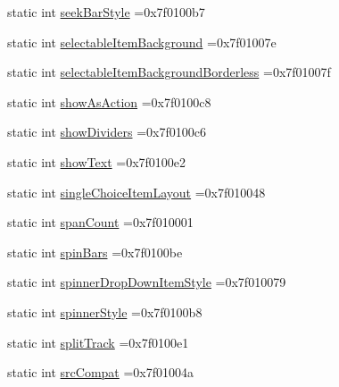 \begin{DoxyCompactItemize}
\item 
static int \hyperlink{classandroid_1_1support_1_1graphics_1_1drawable_1_1R_1_1attr_a460851de45b3a676c01374535644ce2b}{seek\+Bar\+Style} =0x7f0100b7
\item 
static int \hyperlink{classandroid_1_1support_1_1graphics_1_1drawable_1_1R_1_1attr_a04a5ca77af49b575c68c894e524bf504}{selectable\+Item\+Background} =0x7f01007e
\item 
static int \hyperlink{classandroid_1_1support_1_1graphics_1_1drawable_1_1R_1_1attr_a9eb0f075fffc9ddf38011fb7dca661bc}{selectable\+Item\+Background\+Borderless} =0x7f01007f
\item 
static int \hyperlink{classandroid_1_1support_1_1graphics_1_1drawable_1_1R_1_1attr_adbc2e16f8d86de865cf504334096fcf7}{show\+As\+Action} =0x7f0100c8
\item 
static int \hyperlink{classandroid_1_1support_1_1graphics_1_1drawable_1_1R_1_1attr_a319d898a91de1f1ef8f7ff796da4245f}{show\+Dividers} =0x7f0100c6
\item 
static int \hyperlink{classandroid_1_1support_1_1graphics_1_1drawable_1_1R_1_1attr_a811729302e2d44865935bcb2567612c5}{show\+Text} =0x7f0100e2
\item 
static int \hyperlink{classandroid_1_1support_1_1graphics_1_1drawable_1_1R_1_1attr_ae8ba9219e8ee51666a009f4f3ab7de12}{single\+Choice\+Item\+Layout} =0x7f010048
\item 
static int \hyperlink{classandroid_1_1support_1_1graphics_1_1drawable_1_1R_1_1attr_a69614a743b7f2f61bc79c2124cac8b1e}{span\+Count} =0x7f010001
\item 
static int \hyperlink{classandroid_1_1support_1_1graphics_1_1drawable_1_1R_1_1attr_a0bbb8c2047c21baf83647e028df410b9}{spin\+Bars} =0x7f0100be
\item 
static int \hyperlink{classandroid_1_1support_1_1graphics_1_1drawable_1_1R_1_1attr_ab4e68297eced040c3db6fb7bf2a4e867}{spinner\+Drop\+Down\+Item\+Style} =0x7f010079
\item 
static int \hyperlink{classandroid_1_1support_1_1graphics_1_1drawable_1_1R_1_1attr_aaa7e0fb24624790cb46477ebd5ed558b}{spinner\+Style} =0x7f0100b8
\item 
static int \hyperlink{classandroid_1_1support_1_1graphics_1_1drawable_1_1R_1_1attr_af265657b4597d728f27113e894348ffe}{split\+Track} =0x7f0100e1
\item 
static int \hyperlink{classandroid_1_1support_1_1graphics_1_1drawable_1_1R_1_1attr_a1eb6783f9d07e11728b9033e9a7d67ba}{src\+Compat} =0x7f01004a
\item 

\end{DoxyCompactItemize}
